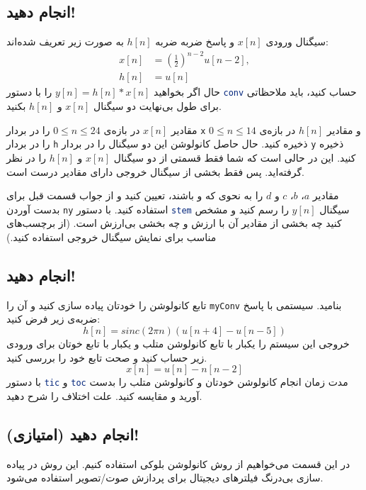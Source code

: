 \documentclass{utsignal}
\begin{document}
	\subsection{انجام دهید!}
		سیگنال ورودی $x[n]$ و پاسخ ضربه ضربه $h[n]$ به صورت زیر تعریف شده‌اند:
		\begin{align*}
			x[n] &= \left(\frac{1}{2}\right)^{n-2}u[n-2],\\
			h[n]‌&= u[n]
		\end{align*}
		حال اگر بخواهید $y[n]=h[n]*x[n]$ را با دستور \lstinline[language=Octave]{conv} حساب کنید، باید ملاحظاتی برای طول بی‌نهایت دو سیگنال $x[n]$ و $h[n]$ بکنید.
		
		مقادیر $x[n]$ در بازه‌ی $0\le n\le24$ را در بردار \lstinline[language=Octave]{x} و مقادیر $h[n]$ در بازه‌ی $0\le n\le14$ را در بردار \lstinline[language=Octave]{h} ذخیره کنید. حال حاصل کانولوشن این دو سیگنال را در بردار \lstinline[language=Octave]{y} ذخیره کنید. این در حالی است که شما فقط قسمتی از دو سیگنال $x[n]$ و $h[n]$ را در نظر گرفته‌اید. پس فقط بخشی از سیگنال خروجی دارای مقادیر درست است.
		
		مقادیر $a$، $b$، $c$ و $d$ را به نحوی که  و  باشند، تعیین کنید و از جواب قسمت قبل برای بدست آوردن \lstinline[language=Octave]{ny} استفاده کنید. با دستور \lstinline[language=Octave]{stem} سیگنال $y[n]$ را رسم کنید و مشخص کنید چه بخشی از مقادیر آن با ارزش و چه بخشی بی‌ارزش است. (از برچسب‌های مناسب برای نمایش سیگنال خروجی استفاده کنید.)
	\subsection{انجام دهید!}
	تابع کانولوشن را خودتان پیاده سازی کنید و آن را \lstinline[language=Octave]{myConv} بنامید.
	سیستمی با پاسخ ضربه‌ی زیر فرض کنید:
	$$
	h[n] = sinc(2\pi n) (u[n + 4] - u[n - 5])
	$$
	خروجی این سیستم را یکبار با تابع کانولوشن متلب و یکبار با تابع خوتان برای ورودی زیر حساب کنید و صحت تابع خود را بررسی کنید.
	$$
	x[n]=u[n]-n[n-2]
	$$
	با دستور \lstinline[language=Octave]{tic} و \lstinline[language=Octave]{toc} مدت زمان انجام کانولوشن خودتان و کانولوشن متلب را بدست آورید و مقایسه کنید. علت اختلاف را شرح دهید.
	\subsection{انجام دهید (امتیازی)!}
	در این قسمت می‌خواهیم از روش کانولوشن بلوکی استفاده کنیم. این روش در پیاده سازی بی‌درنگ فیلترهای دیجیتال برای پردازش صوت/تصویر استفاده می‌شود.
\end{document}

